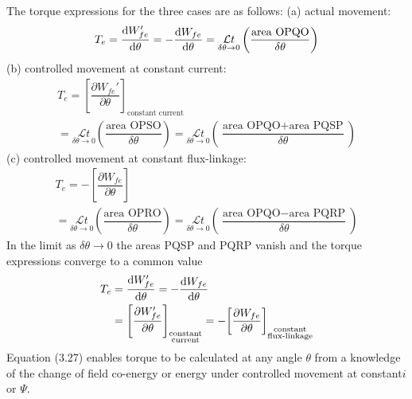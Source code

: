 \documentclass[a4paper,numbers=noenddot,12pt]{scrbook}
\begin{document}
            The torque expressions for the three cases are as follows: 
            (a) actual movement: 
            \begin{equation}
                T_e = \dfrac{\dif W_{fe}'}{\dif \theta} = -\dfrac{\dif W_{fe}}{\dif \theta} = \underset{\delta \theta \to 0}{\mathcal{L} t}\left( \dfrac{\text{area OPQO}}{\delta \theta}\right)
                \label{eq:Eq3.24}
            \end{equation}
            (b) controlled movement at constant current:
            \begin{multline}
                T_e = {\left[ \dfrac{\partial W_{fe}'}{\partial \theta}\right]}_{\text{constant current}} \\
                = \underset{\delta \theta \to 0}{\mathcal{L} t}\left( \dfrac{\text{area OPSO}}{\delta \theta}\right) = \underset{\delta \theta \to 0}{\mathcal{L} t}\left( \dfrac{\text{area OPQO} + \text{area PQSP}}{\delta \theta}\right)
                \label{eq:Eq3.25}
            \end{multline}
            (c) controlled movement at constant flux-linkage:
            \begin{multline}
                T_e = -{\left[ \dfrac{\partial W_{fe}}{\partial \theta}\right]} \\
                = \underset{\delta \theta \to 0}{\mathcal{L} t}\left( \dfrac{\text{area OPRO}}{\delta \theta}\right) = \underset{\delta \theta \to 0}{\mathcal{L} t}\left( \dfrac{\text{area OPQO} - \text{area PQRP}}{\delta \theta}\right)
                \label{eq:Eq3.26}
            \end{multline}
            In the limit as $\delta \theta \to 0$ the areas PQSP and PQRP vanish and the torque expressions converge to a common value
            \begin{align}
                T_e & = \dfrac{\dif W_{fe}'}{\dif \theta} = - \dfrac{\dif W_{fe}}{\dif \theta} \nonumber \\
                & = {\left[\dfrac{\partial W_{fe}'}{\partial \theta} \right]}_{\substack{\text{constant}\\\text{current}}} = - {\left[ \dfrac{\partial W_{fe}}{\partial \theta}\right]}_{\substack{\text{constant}\\\text{flux-linkage}}}
                \label{eq:Eq3.27}
            \end{align}
            Equation (3.27) enables torque to be calculated at any angle $\theta$ from a knowledge of the change of field co-energy or energy under controlled movement at constant$ i$ or $\varPsi$.
\end{document}

